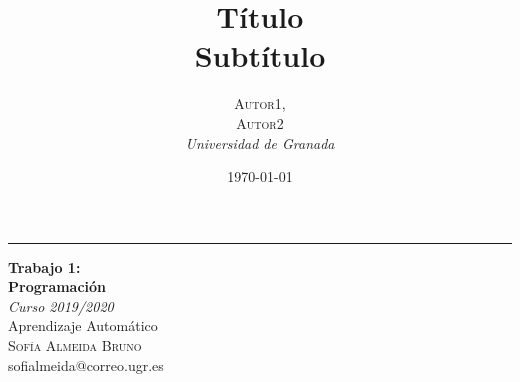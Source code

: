 \documentclass[a4paper, 20pt]{article}
\title{\textbf{Título}\\ %
Subtítulo} %
\author{\textsc{Autor1,\\Autor2} %
\\{\textit{Universidad de Granada}}} %
\date{\today} %
\begin{document}

\begin{titlepage} %
	
	\raggedleft %
	
	\rule{1pt}{\textheight} %
	\hspace{0.05\textwidth} %
	\parbox[b]{0.8\textwidth}{ %
		
		{\Huge\bfseries Trabajo 1:\\[0.5\baselineskip] Programación\\[2\baselineskip]} %
		{\large\textit{Curso 2019/2020}\\[0.5\baselineskip]Aprendizaje Automático\\[1\baselineskip] }%
		{\Large\textsc{Sofía Almeida Bruno}\\[0.5\baselineskip]sofialmeida@correo.ugr.es} %
		
		\vspace{0.4\textheight} %
		
		{\noindent \\[0.5\baselineskip] }\\[\baselineskip] %
	}

\end{titlepage}




{\parskip=2pt
  \tableofcontents
}
\pagebreak
\end{document}
